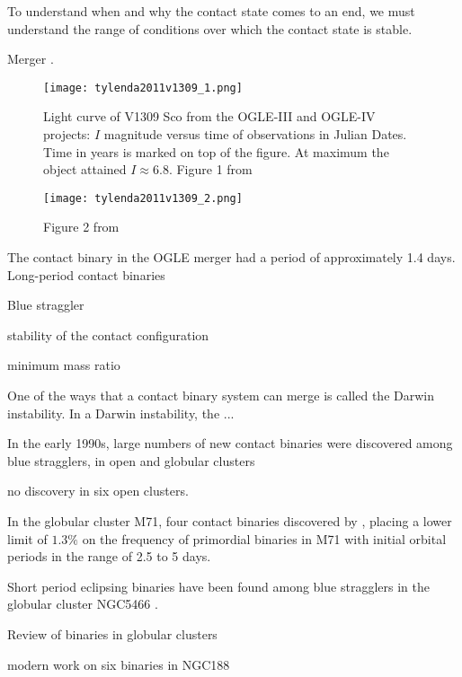 \documentclass[12pt]{article} %
\numberwithin{equation}{section} %
\begin{document}
To understand when and why the contact state comes to an end, we must understand the range of conditions over which the contact state is stable.

Merger \citet{tylenda2011v1309}.

\begin{figure}[H]
\centering
\texttt{[image: tylenda2011v1309\_1.png]}
\caption{Light curve of V1309 Sco from the OGLE-III and OGLE-IV projects: $I$ magnitude versus time of observations in Julian Dates. Time in years is marked on top of the figure. At maximum the object attained $I \approx 6.8$. Figure 1 from \citet{tylenda2011v1309}}
\label{fig: tylenda2011v1309_1}
\end{figure}

\begin{figure}[H]
\centering
\texttt{[image: tylenda2011v1309\_2.png]}
\caption{Figure 2 from \citet{tylenda2011v1309}}
\label{fig: tylenda2011v1309_2}
\end{figure}


The contact binary in the OGLE merger had a period of approximately 1.4 days. Long-period contact binaries \citep{rucinski1998eclipsing} 

Blue straggler \citet{andronov2006mergers}

stability of the contact configuration \citep{rasio1995minimum}

minimum mass ratio \citep{arbutina2009possible} \citep{arbutina2009}

One of the ways that a contact binary system can merge is called the Darwin instability. In a Darwin instability, the ...

In the early 1990s, large numbers of new contact binaries were discovered among blue stragglers, in open and globular clusters 

\citep{kaluzny1988ccd} no discovery in six open clusters.

In the globular cluster M71, four contact binaries discovered by \citet{yan1994primordial}, placing a lower limit of $1.3\%$ on the frequency of primordial binaries in M71 with initial orbital periods in the range of 2.5 to 5 days. 

Short period eclipsing binaries have been found among blue stragglers in the globular cluster NGC5466 \citep{mateo1990blue}.

Review of binaries in globular clusters \citep{hut1992binaries}

modern work on six binaries in NGC188 \citep{chen2016physical}
\end{document}
